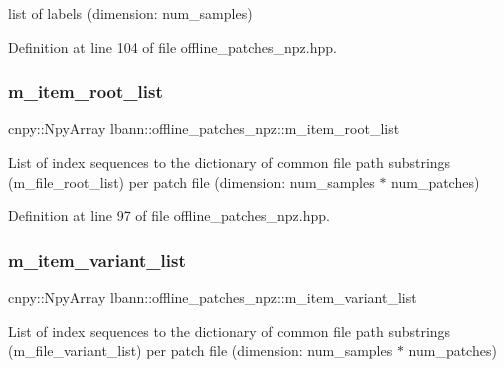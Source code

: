 list of labels (dimension\+: num\+\_\+samples) 



Definition at line 104 of file offline\+\_\+patches\+\_\+npz.\+hpp.

\mbox{\label{classlbann_1_1offline__patches__npz_a5d61c89e80f8e67b4850fb72792ce862}} 
\subsubsection{\texorpdfstring{m\+\_\+item\+\_\+root\+\_\+list}{m\_item\_root\_list}}
{\footnotesize\ttfamily cnpy\+::\+Npy\+Array lbann\+::offline\+\_\+patches\+\_\+npz\+::m\+\_\+item\+\_\+root\+\_\+list\hspace{0.3cm}{\ttfamily [protected]}}

List of index sequences to the dictionary of common file path substrings (m\+\_\+file\+\_\+root\+\_\+list) per patch file (dimension\+: num\+\_\+samples $\ast$ num\+\_\+patches) 

Definition at line 97 of file offline\+\_\+patches\+\_\+npz.\+hpp.

\mbox{\label{classlbann_1_1offline__patches__npz_a5aec35e7b2f9956b8e7e8ce5cbb3ff22}} 
\subsubsection{\texorpdfstring{m\+\_\+item\+\_\+variant\+\_\+list}{m\_item\_variant\_list}}
{\footnotesize\ttfamily cnpy\+::\+Npy\+Array lbann\+::offline\+\_\+patches\+\_\+npz\+::m\+\_\+item\+\_\+variant\+\_\+list\hspace{0.3cm}{\ttfamily [protected]}}

List of index sequences to the dictionary of common file path substrings (m\+\_\+file\+\_\+variant\+\_\+list) per patch file (dimension\+: num\+\_\+samples $\ast$ num\+\_\+patches) 

